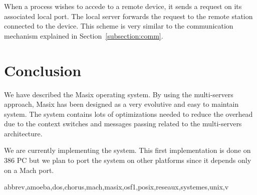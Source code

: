 	When a process wishes to accede to a remote device, it sends a request
on its associated local port. The local server forwards the request to the
remote station connected to the device. This scheme is very similar to the
communication mechanism explained in Section~\ref {subsection:comm}.

\section {Conclusion}

	We have described the Masix operating system. By using the
multi-servers approach, Masix has been designed as a very evolutive and easy
to maintain system. The system contains lots of optimizations needed to
reduce the overhead due to the context switches and messages passing related
to the multi-servers architecture.

	We are currently implementing the system. This first implementation
is done on 386 PC but we plan to port the system on other platforms since it
depends only on a Mach port.

	 {abbrev,amoeba,dos,chorus,mach,masix,osf1,posix,reseaux,systemes,unix,v}


